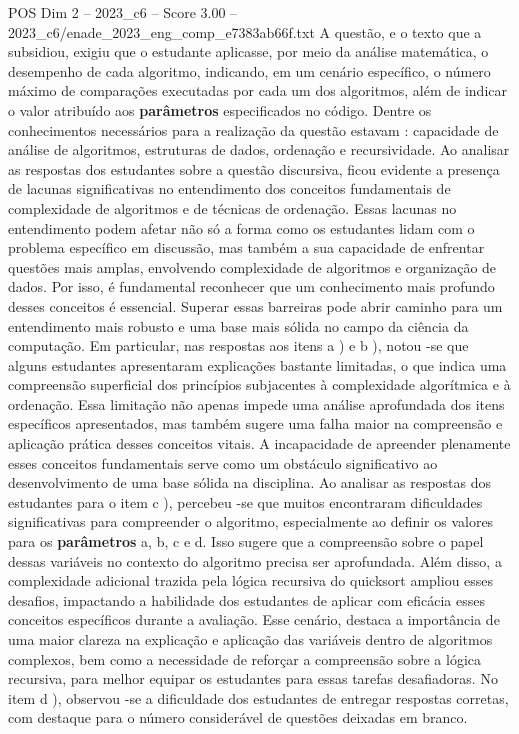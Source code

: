 \begin{textsample}{POS Dim 2 – 2023\_c6 – Score 3.00 – 2023\_c6/enade\_2023\_eng\_comp\_e7383ab66f.txt}
A questão, e o texto que a subsidiou, exigiu que o estudante aplicasse, por meio da análise matemática, o desempenho de cada algoritmo, indicando, em um cenário específico, o número máximo de comparações executadas por cada um dos algoritmos, além de indicar o valor atribuído aos \textbf{parâmetros} especificados no código.
Dentre os conhecimentos necessários para a realização da questão estavam : capacidade de análise de algoritmos, estruturas de dados, ordenação e recursividade.
Ao analisar as respostas dos estudantes sobre a questão discursiva, ficou evidente a presença de lacunas significativas no entendimento dos conceitos fundamentais de complexidade de algoritmos e de técnicas de ordenação.
Essas lacunas no entendimento podem afetar não só a forma como os estudantes lidam com o problema específico em discussão, mas também a sua capacidade de enfrentar questões mais amplas, envolvendo complexidade de algoritmos e organização de dados.
Por isso, é fundamental reconhecer que um conhecimento mais profundo desses conceitos é essencial.
Superar essas barreiras pode abrir caminho para um entendimento mais robusto e uma base mais sólida no campo da ciência da computação.
Em particular, nas respostas aos itens a ) e b ), notou -se que alguns estudantes apresentaram explicações bastante limitadas, o que indica uma compreensão superficial dos princípios subjacentes à complexidade algorítmica e à ordenação.
Essa limitação não apenas impede uma análise aprofundada dos itens específicos apresentados, mas também sugere uma falha maior na compreensão e aplicação prática desses conceitos vitais.
A incapacidade de apreender plenamente esses conceitos fundamentais serve como um obstáculo significativo ao desenvolvimento de uma base sólida na disciplina.
Ao analisar as respostas dos estudantes para o item c ), percebeu -se que muitos encontraram dificuldades significativas para compreender o algoritmo, especialmente ao definir os valores para os \textbf{parâmetros} a, b, c e d.
Isso sugere que a compreensão sobre o papel dessas variáveis no contexto do algoritmo precisa ser aprofundada.
Além disso, a complexidade adicional trazida pela lógica recursiva do quicksort ampliou esses desafios, impactando a habilidade dos estudantes de aplicar com eficácia esses conceitos específicos durante a avaliação.
Esse cenário, destaca a importância de uma maior clareza na explicação e aplicação das variáveis dentro de algoritmos complexos, bem como a necessidade de reforçar a compreensão sobre a lógica recursiva, para melhor equipar os estudantes para essas tarefas desafiadoras.
No item d ), observou -se a dificuldade dos estudantes de entregar respostas corretas, com destaque para o número considerável de questões deixadas em branco.

\end{textsample}

